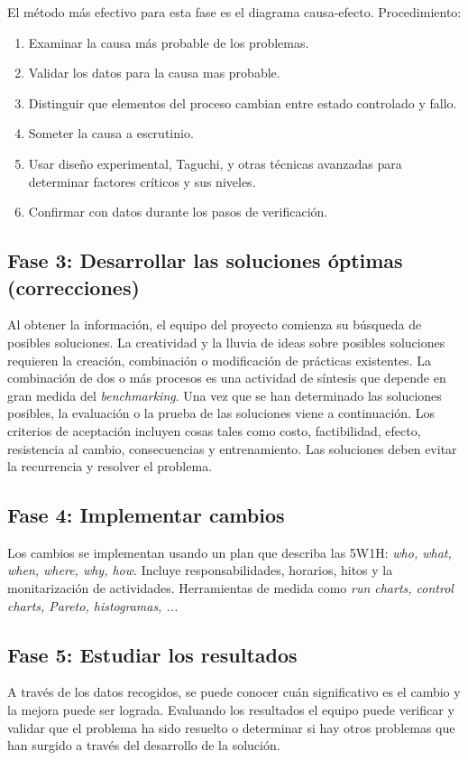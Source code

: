 \documentclass[]{article}
\begin{document}
El método más efectivo para esta fase es el diagrama causa-efecto.
Procedimiento:
\begin{enumerate}
	\item Examinar la causa más probable de los problemas.
	\item Validar los datos para la causa mas probable.
	\item Distinguir que elementos del proceso cambian entre estado controlado y fallo.
	\item Someter la causa a escrutinio.
	\item Usar diseño experimental, Taguchi, y otras técnicas avanzadas para determinar factores críticos y sus niveles.
	\item Confirmar con datos durante los pasos de verificación.
\end{enumerate}

\subsection{Fase 3: Desarrollar las soluciones óptimas (correcciones)}
Al obtener la información, el equipo del proyecto comienza su búsqueda de posibles soluciones. La creatividad y la lluvia de ideas sobre posibles soluciones requieren la creación, combinación o modificación de prácticas existentes. La combinación de dos o más procesos es una actividad de síntesis que depende en gran medida del \textit{benchmarking}.
Una vez que se han determinado las soluciones posibles, la evaluación o la prueba de las soluciones viene a continuación. Los criterios de aceptación incluyen cosas tales como costo, factibilidad, efecto, resistencia al cambio, consecuencias y entrenamiento. Las soluciones deben evitar la recurrencia y resolver el problema.

\subsection{Fase 4: Implementar cambios}
Los cambios se implementan usando un plan que describa las 5W1H: \textit{who, what, when, where, why, how}. Incluye responsabilidades, horarios, hitos y la monitarización de actividades. Herramientas de medida como \textit{run charts, control charts, Pareto, histogramas, ...}

\subsection{Fase 5: Estudiar los resultados}
A través de los datos recogidos, se puede conocer cuán significativo es el cambio y la mejora puede ser lograda. Evaluando los resultados el equipo puede verificar y validar que el problema ha sido resuelto o determinar si hay otros problemas que han surgido a través del desarrollo de la solución.
\end{document}
